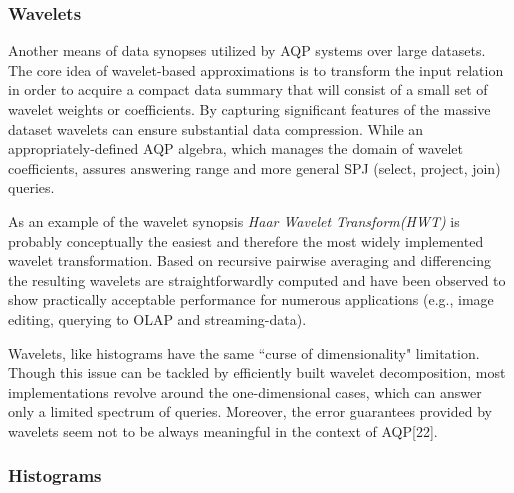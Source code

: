 \documentclass[10pt, conference, compsocconf]{IEEEtran}
\begin{document}
\subsubsection{\textbf{Wavelets}}

Another means of data synopses utilized by AQP systems over large datasets. The core idea of wavelet-based approximations is to transform the input relation in order to acquire a compact data summary that will consist of a small set of wavelet weights or coefficients. By capturing significant features of the massive dataset wavelets can ensure substantial data compression. While an appropriately-defined AQP algebra, which manages the domain of wavelet coefficients, assures answering range and more general SPJ (select, project, join) queries. 

As an example of the wavelet synopsis \textit{Haar Wavelet Transform(HWT)} is probably conceptually the easiest and therefore the most widely implemented wavelet transformation. Based on recursive pairwise averaging and differencing the resulting wavelets are straightforwardly computed and have been observed to show practically acceptable performance for numerous applications (e.g., image editing, querying to OLAP and streaming-data).

Wavelets, like histograms have the same ``curse of dimensionality" limitation. Though this issue can be tackled by efficiently built wavelet decomposition, most implementations revolve around the one-dimensional cases, which can answer only a limited spectrum of queries. Moreover, the error guarantees provided by wavelets seem not to be always meaningful in the context of AQP[22]. \\


\subsubsection{\textbf{Histograms}}
\end{document}
